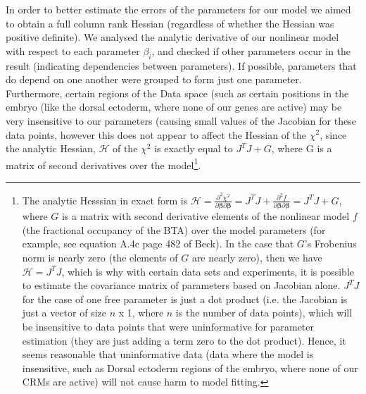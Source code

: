 In order to better estimate the errors of the parameters for our model we aimed to obtain a full column rank Hessian (regardless of whether the Hessian was positive definite).  We analysed the analytic derivative of our nonlinear model with respect to each parameter $\beta_i$, and checked if other parameters occur in the result (indicating dependencies between parameters).  If possible, parameters that do depend on one another were grouped to form just one parameter\cite{beck}.  Furthermore, certain regions of the Data space (such as certain positions in the embryo (like the dorsal ectoderm, where none of our genes are active) may be very insensitive to our parameters (causing small values of the Jacobian for these data points, however this does not appear to affect the Hessian of the $\chi^2$, since the analytic Hessian, $\mathcal H$ of the $\chi^2$ is exactly equal to $J^TJ+G$, where G is a matrix of second derivatives over the model\footnote{The analytic Hesssian in exact form is  $\mathcal H=\frac{\partial^2{\chi^2}}{\partial{\mathbf{\beta}}\partial{\mathbf{\beta}}} = J^TJ + \frac{\partial^2{f}}{\partial{\mathbf{\beta}}\partial{\mathbf{\beta}}} = J^TJ +G$, where $G$ is a matrix with second derivative elements of the nonlinear model $f$ (the fractional occupancy of the BTA) over the model parameters (for example, see equation A.4c page 482 of Beck\cite{beck}).  In the case that $G$'s Frobenius norm is nearly zero (the elements of $G$ are nearly zero), then we have $\mathcal H=J^TJ$, which is why with certain data sets and experiments, it is possible to estimate the covariance matrix of parameters based on Jacobian alone.  $J^TJ$ for the case of one free parameter is just a dot product (i.e. the Jacobian is just a vector of size $n$ x 1, where $n$ is the number of data points), which will be insensitive to data points that were uninformative for parameter estimation (they are just adding a term zero to the dot product).  Hence, it seems reasonable that uninformative data (data where the model is insensitive, such as Dorsal ectoderm regions of the embryo, where none of our CRMs are active) will not cause harm to model fitting.}.  

